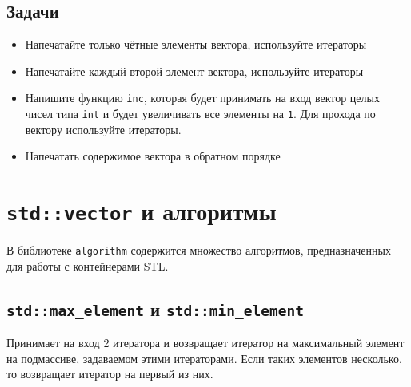 \documentclass{article}
\begin{document}
\subsection*{Задачи}
\begin{itemize}
\item Напечатайте только чётные элементы вектора, используйте итераторы
\item Напечатайте каждый второй элемент вектора, используйте итераторы
\item Напишите функцию \texttt{inc}, которая будет принимать на вход вектор целых чисел типа \texttt{int} и будет увеличивать все элементы на \texttt{1}. Для прохода по вектору используйте итераторы.
\item Напечатать содержимое вектора в обратном порядке
\end{itemize}


\newpage
\section*{\texttt{std::vector} и алгоритмы}
В библиотеке \texttt{algorithm} содержится множество алгоритмов, предназначенных для работы с контейнерами STL.
\subsection*{\texttt{std::max\_element} и \texttt{std::min\_element}}
Принимает на вход 2 итератора и возвращает итератор на максимальный элемент на подмассиве, задаваемом этими итераторами. Если таких элементов несколько, то возвращает итератор на первый из них.
\end{document}
